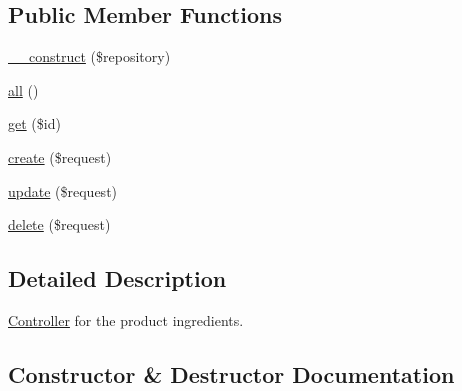 \subsection*{Public Member Functions}
\begin{DoxyCompactItemize}
\item 
\mbox{\hyperlink{class_app_1_1_http_1_1_controllers_1_1_product_1_1_ingredient_controller_a5b75ba6bc9debb999c0186a31978ec03}{\+\_\+\+\_\+construct}} (\$repository)
\item 
\mbox{\hyperlink{class_app_1_1_http_1_1_controllers_1_1_product_1_1_ingredient_controller_af9d14e4ae6227970ad603987781573ca}{all}} ()
\item 
\mbox{\hyperlink{class_app_1_1_http_1_1_controllers_1_1_product_1_1_ingredient_controller_a50e3bfb586b2f42932a6a93f3fbb0828}{get}} (\$id)
\item 
\mbox{\hyperlink{class_app_1_1_http_1_1_controllers_1_1_product_1_1_ingredient_controller_a4fa811c83f27da01b0d92bdb2a711a13}{create}} (\$request)
\item 
\mbox{\hyperlink{class_app_1_1_http_1_1_controllers_1_1_product_1_1_ingredient_controller_ab7b27a90191560dcef32126b0945db0d}{update}} (\$request)
\item 
\mbox{\hyperlink{class_app_1_1_http_1_1_controllers_1_1_product_1_1_ingredient_controller_a126a3799c44d72393ca4732081306dfd}{delete}} (\$request)
\end{DoxyCompactItemize}


\subsection{Detailed Description}
\mbox{\hyperlink{class_app_1_1_http_1_1_controllers_1_1_controller}{Controller}} for the product ingredients. 

\subsection{Constructor \& Destructor Documentation}
\mbox{\label{class_app_1_1_http_1_1_controllers_1_1_product_1_1_ingredient_controller_a5b75ba6bc9debb999c0186a31978ec03}} 
